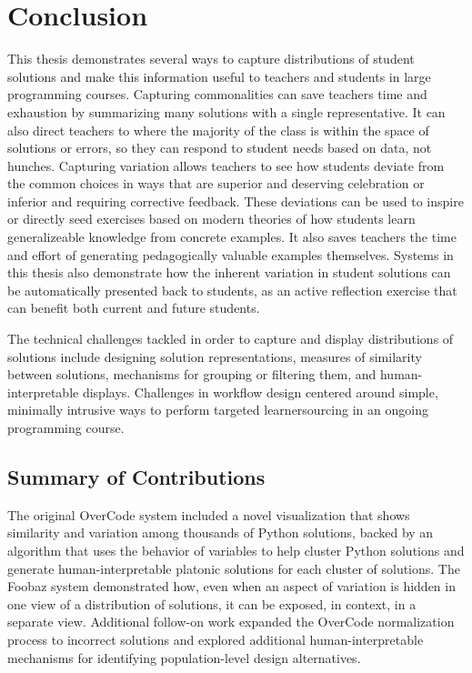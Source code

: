 \chapter{Conclusion}\label{chapter:conclusion}

This thesis demonstrates several ways to capture distributions of student solutions and make this information useful to teachers and students in large programming courses. Capturing commonalities can save teachers time and exhaustion by summarizing many solutions with a single representative. It can also direct teachers to where the majority of the class is within the space of solutions or errors, so they can respond to student needs based on data, not hunches. Capturing variation allows teachers to see how students deviate from the common choices in ways that are superior and deserving celebration or inferior and requiring corrective feedback. These deviations can be used to inspire or directly seed exercises based on modern theories of how students learn generalizeable knowledge from concrete examples. It also saves teachers the time and effort of generating pedagogically valuable examples themselves. Systems in this thesis also demonstrate how the inherent variation in student solutions can be automatically presented back to students, as an active reflection exercise that can benefit both current and future students. 

The technical challenges tackled in order to capture and display distributions of solutions include designing solution representations, measures of similarity between solutions, mechanisms for grouping or filtering them, and human-interpretable displays. Challenges in workflow design centered around simple, minimally intrusive ways to perform targeted learnersourcing in an ongoing programming course.

\section{Summary of Contributions}

The original OverCode system included a novel visualization that shows similarity and variation among thousands of Python solutions, backed by an algorithm that uses the behavior of variables to help cluster Python solutions and generate human-interpretable platonic solutions for each cluster of solutions. The Foobaz system demonstrated how, even when an aspect of variation is hidden in one view of a distribution of solutions, it can be exposed, in context, in a separate view. Additional follow-on work expanded the OverCode normalization process to incorrect solutions and explored additional human-interpretable mechanisms for identifying population-level design alternatives.

